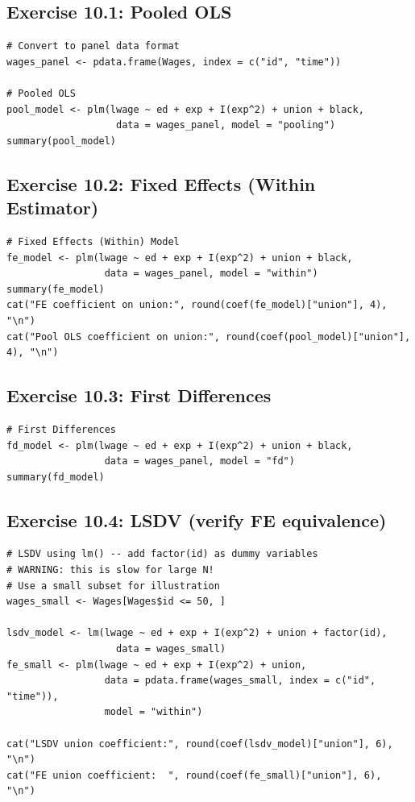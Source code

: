 \subsection{Exercise 10.1: Pooled OLS}

\begin{lstlisting}
# Convert to panel data format
wages_panel <- pdata.frame(Wages, index = c("id", "time"))

# Pooled OLS
pool_model <- plm(lwage ~ ed + exp + I(exp^2) + union + black,
                   data = wages_panel, model = "pooling")
summary(pool_model)
\end{lstlisting}

\subsection{Exercise 10.2: Fixed Effects (Within Estimator)}

\begin{lstlisting}
# Fixed Effects (Within) Model
fe_model <- plm(lwage ~ ed + exp + I(exp^2) + union + black,
                 data = wages_panel, model = "within")
summary(fe_model)
cat("FE coefficient on union:", round(coef(fe_model)["union"], 4), "\n")
cat("Pool OLS coefficient on union:", round(coef(pool_model)["union"], 4), "\n")
\end{lstlisting}

\subsection{Exercise 10.3: First Differences}

\begin{lstlisting}
# First Differences
fd_model <- plm(lwage ~ ed + exp + I(exp^2) + union + black,
                 data = wages_panel, model = "fd")
summary(fd_model)
\end{lstlisting}

\subsection{Exercise 10.4: LSDV (verify FE equivalence)}

\begin{lstlisting}
# LSDV using lm() -- add factor(id) as dummy variables
# WARNING: this is slow for large N!
# Use a small subset for illustration
wages_small <- Wages[Wages$id <= 50, ]

lsdv_model <- lm(lwage ~ ed + exp + I(exp^2) + union + factor(id),
                   data = wages_small)
fe_small <- plm(lwage ~ ed + exp + I(exp^2) + union,
                 data = pdata.frame(wages_small, index = c("id", "time")),
                 model = "within")

cat("LSDV union coefficient:", round(coef(lsdv_model)["union"], 6), "\n")
cat("FE union coefficient:  ", round(coef(fe_small)["union"], 6), "\n")
\end{lstlisting}

